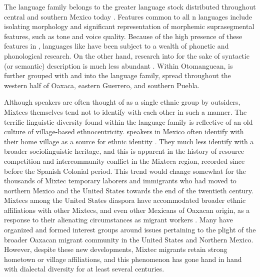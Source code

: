 \documentclass[output=paper,modfonts,nonflat]{langsci/langscibook}
\begin{document}
The  language family belongs to the greater  language stock distributed throughout central and southern Mexico today \citep{Rensch1976}.  Features common to all n languages include isolating morphology and significant representation of morphemic suprasegmental features, such as tone and voice quality.  Because of the high presence of these features in , languages like  have been subject to a wealth of phonetic and phonological research. On the other hand, research into  for the sake of syntactic (or semantic) description is much less abundant \citep{Bradley1988}.  Within Otomanguean,  is further grouped with  and  into the  language family, spread throughout the western half of Oaxaca, eastern Guerrero, and southern Puebla.

Although  speakers are often thought of as a single ethnic group by outsiders, Mixtecs themselves tend not to identify with each other in such a manner.  The terrific linguistic diversity found within the  language family is reflective of an old culture of village-based ethnocentricity.   speakers in Mexico often identify with their home village as a source for ethnic identity \citep[221--223]{Spores2013}.  They much less identify with a broader  sociolinguistic heritage, and this is apparent in the history of resource competition and intercommunity conflict in the Mixteca region, recorded since before the Spanish Colonial period.  This trend would change somewhat for the thousands of Mixtec temporary laborers and immigrants who had moved to northern Mexico and the United States towards the end of the twentieth century.  Mixtecs among the United States diaspora have accommodated broader ethnic affiliations with other Mixtecs, and even other Mexicans of Oaxacan origin, as a response to their alienating circumstances as migrant workers \citep[228--235]{VelascoOrtiz2005,Spores2013}.  Many have organized and formed interest groups around issues pertaining to the plight of the broader Oaxacan migrant community in the United States and Northern Mexico.  However, despite these new developments, Mixtec migrants retain strong hometown or village affiliations, and this phenomenon has gone hand in hand with  dialectal diversity for at least several centuries.
\end{document}
